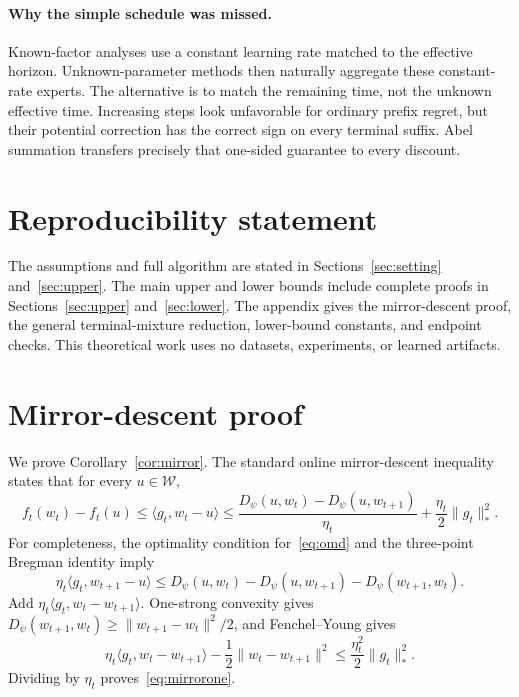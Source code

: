 \documentclass{article}
\newcommand{\W}{\mathcal W}
\begin{document}
\paragraph{Why the simple schedule was missed.} Known-factor analyses use a constant learning rate matched to the effective horizon. Unknown-parameter methods then naturally aggregate these constant-rate experts. The alternative is to match the remaining time, not the unknown effective time. Increasing steps look unfavorable for ordinary prefix regret, but their potential correction has the correct sign on every terminal suffix. Abel summation transfers precisely that one-sided guarantee to every discount.

\section*{Reproducibility statement}

The assumptions and full algorithm are stated in Sections~\ref{sec:setting} and~\ref{sec:upper}. The main upper and lower bounds include complete proofs in Sections~\ref{sec:upper} and~\ref{sec:lower}. The appendix gives the mirror-descent proof, the general terminal-mixture reduction, lower-bound constants, and endpoint checks. This theoretical work uses no datasets, experiments, or learned artifacts.




\appendix

\section{Mirror-descent proof}
\label{app:mirror}

We prove Corollary~\ref{cor:mirror}. The standard online mirror-descent inequality states that for every $u\in\W$,
\begin{equation}
f_t(w_t)-f_t(u)\le\langle g_t,w_t-u\rangle
\le\frac{D_\psi(u,w_t)-D_\psi(u,w_{t+1})}{\eta_t}+\frac{\eta_t}{2}\|g_t\|_*^2.
\label{eq:mirrorone}
\end{equation}
For completeness, the optimality condition for~\eqref{eq:omd} and the three-point Bregman identity imply \[ \eta_t\langle g_t,w_{t+1}-u\rangle\le D_\psi(u,w_t)-D_\psi(u,w_{t+1})-D_\psi(w_{t+1},w_t). \] Add $\eta_t\langle g_t,w_t-w_{t+1}\rangle$. One-strong convexity gives $D_\psi(w_{t+1},w_t)\ge\|w_{t+1}-w_t\|^2/2$, and Fenchel--Young gives \[ \eta_t\langle g_t,w_t-w_{t+1}\rangle-\frac12\|w_t-w_{t+1}\|^2\le\frac{\eta_t^2}{2}\|g_t\|_*^2. \] Dividing by $\eta_t$ proves~\eqref{eq:mirrorone}.
\end{document}
